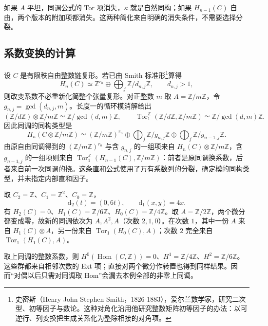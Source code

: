 \ProseParagraphBreak
如果 \(A\) 平坦，同调公式的 Tor 项消失，\(\kappa\) 就是自然同构；如果 \(H_{n-1}(C)\) 自由，两个版本的附加项都消失。这两种简化来自明确的消失条件，不需要选择分裂。

\subsection{系数变换的计算}
\label{b4:subsec:0903:03}

设 \(C\) 是有限秩自由整数链复形。若已由 Smith 标准形\footnote{史密斯（Henry John Stephen Smith，1826-1883），爱尔兰数学家，研究二次型、初等因子与数论。这种对角化沿用他研究整数矩阵初等因子的办法：以可逆行、列变换把生成关系化为整除相接的对角项。}算得
\[
	H_n(C)\simeq\mathbb Z^{r_n}\oplus\bigoplus_j\mathbb Z/d_{n,j}\mathbb Z, \qquad d_{n,j}>1,
\]
则改变系数不必重新化简整个张量复形。对正整数 \(m\) 取 \(A=\mathbb Z/m\mathbb Z\)，令 \(g_{n,j}=\gcd(d_{n,j},m)\)。长度一的循环模消解给出
\[
	(\mathbb Z/d\mathbb Z)\otimes\mathbb Z/m\mathbb Z\simeq\mathbb Z/\gcd(d,m)\mathbb Z,\qquad \operatorname{Tor}_1^{\mathbb Z}(\mathbb Z/d\mathbb Z,\mathbb Z/m\mathbb Z) \simeq\mathbb Z/\gcd(d,m)\mathbb Z.
\]
因此同调的同构类型是
\[
	H_n(C\otimes\mathbb Z/m\mathbb Z)\simeq (\mathbb Z/m\mathbb Z)^{r_n}\oplus\bigoplus_j\mathbb Z/g_{n,j}\mathbb Z \oplus\bigoplus_j\mathbb Z/g_{n-1,j}\mathbb Z.
\]
由原自由同调得到的 \((\mathbb Z/m\mathbb Z)^{r_n}\) 与含 \(g_{n,j}\) 的一组项来自 \(H_n(C)\otimes\mathbb Z/m\mathbb Z\)，含 \(g_{n-1,j}\) 的一组项则来自 \(\operatorname{Tor}_1^{\mathbb Z}(H_{n-1}(C),\mathbb Z/m\mathbb Z)\)：前者是原同调换系数，后者来自前一次同调的挠。这条直和公式使用了万有系数列的分裂，确定模的同构类型，并未指定内部直和因子。

\begin{example}\label{b4:exm:uct-integer-computation}
	取 \(C_2=\mathbb Z\)、\(C_1=\mathbb Z^2\)、\(C_0=\mathbb Z\)，
	\[
		\mathrm{d}_2(t)=(0,6t),\qquad \mathrm{d}_1(x,y)=4x.
	\]
	有 \(H_2(C)=0\)、\(H_1(C)=\mathbb Z/6\mathbb Z\)、\(H_0(C)=\mathbb Z/4\mathbb Z\)。取 \(A=\mathbb Z/2\mathbb Z\)，两个微分都变成零，故新的同调依次为 \(A,A^2,A\)（次数 \(2,1,0\)）。在次数 \(1\)，其中一份 \(A\) 来自 \(H_1(C)\otimes A\)，另一份来自 \(\operatorname{Tor}_1(H_0(C),A)\)；次数 \(2\) 完全来自 \(\operatorname{Tor}_1(H_1(C),A)\)。

	\ProseParagraphBreak
	取上同调的整数系数，则 \(H^0(\operatorname{Hom}(C,\mathbb Z))=0\)、\(H^1=\mathbb Z/4\mathbb Z\)、\(H^2=\mathbb Z/6\mathbb Z\)。这些群都来自相邻次数的 Ext 项；直接对两个微分作转置也得到同样结果。因而“对偶以后只需对同调取 Hom”会漏去本例全部的非零上同调。
\end{example}
